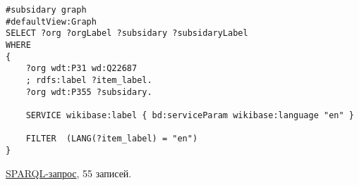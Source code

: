 \begin{lstlisting}[language=SPARQL,label=suborgs2,caption=Граф родительских и дочерных организаций без висячих вершин]
#subsidary graph
#defaultView:Graph
SELECT ?org ?orgLabel ?subsidary ?subsidaryLabel
WHERE
{
    ?org wdt:P31 wd:Q22687
    ; rdfs:label ?item_label.
    ?org wdt:P355 ?subsidary. 
  
    SERVICE wikibase:label { bd:serviceParam wikibase:language "en" }

    FILTER  (LANG(?item_label) = "en") 
}
\end{lstlisting}

\href{https://query.wikidata.org/#%23neighboring%20countries%20graph%0A%23defaultView%3AGraph%0ASELECT%20%3Forg%20%3ForgLabel%20%3Fsubsidary%20%3FsubsidaryLabel%0AWHERE%0A%7B%0A%20%20%20%20%3Forg%20wdt%3AP31%20wd%3AQ22687%0A%20%20%20%20%3B%20rdfs%3Alabel%20%3Fitem_label%20.%0A%20%20%20%20%3Forg%20wdt%3AP355%20%3Fsubsidary%20.%20%0A%20%20%0A%20%20%20%20SERVICE%20wikibase%3Alabel%20%7B%20bd%3AserviceParam%20wikibase%3Alanguage%20%22en%22%20%7D%0A%0A%20%20%20%20FILTER%20%20%28LANG%28%3Fitem_label%29%20%3D%20%22en%22%29%20%0A%7D%0A}{SPARQL-запрос}, 55 записей.
